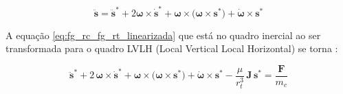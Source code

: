 \begin{equation}
\label{eq:TransporteSymon1979}
\ddot{\mathbf s} = 
\ddot{\mathbf s}^{*}
+ 2\boldsymbol\omega\times\dot{\mathbf s}^{*}
+ \boldsymbol\omega\times\big(\boldsymbol\omega\times\mathbf s^{*}\big)
+ \dot{\boldsymbol\omega}\times\mathbf s^{*}
\end{equation}

A equação \eqref{eq:fg_rc_fg_rt_linearizada} que está no quadro inercial ao ser transformada para o quadro LVLH (Local Vertical Local Horizontal) se torna \cite{fehse2003}:

\begin{equation}
\label{eq:relativo_LVLHgeral}
\ddot{\mathbf s}^{*}
+ 2\,\boldsymbol\omega\times\dot{\mathbf s}^{*}
+ \boldsymbol\omega\times\big(\boldsymbol\omega\times\mathbf s^{*}\big)
+ \dot{\boldsymbol\omega}\times\mathbf s^{*}
- \frac{\mu}{r_t^3}\,\mathbf J\,\mathbf s^{*}
= \frac{\mathbf F}{m_c}
\end{equation}








